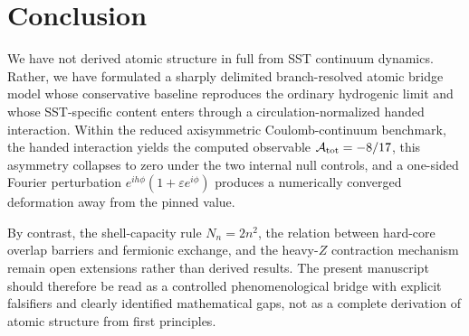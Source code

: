 \documentclass[11pt,a4paper]{article}
\begin{document}
    \section{Conclusion}
    \label{sec:conclusion}
    We have not derived atomic structure in full from SST continuum dynamics. Rather, we have formulated a sharply delimited branch-resolved atomic bridge model whose conservative baseline reproduces the ordinary hydrogenic limit and whose SST-specific content enters through a circulation-normalized handed interaction. Within the reduced axisymmetric Coulomb-continuum benchmark, the handed interaction yields the computed observable $\mathcal A_{\rm tot}=-8/17$, this asymmetry collapses to zero under the two internal null controls, and a one-sided Fourier perturbation $e^{i h\phi}(1+\varepsilon e^{i\phi})$ produces a numerically converged deformation away from the pinned value.
    
    By contrast, the shell-capacity rule $N_n=2n^2$, the relation between hard-core overlap barriers and fermionic exchange, and the heavy-$Z$ contraction mechanism remain open extensions rather than derived results. The present manuscript should therefore be read as a controlled phenomenological bridge with explicit falsifiers and clearly identified mathematical gaps, not as a complete derivation of atomic structure from first principles.
        
\end{document}

